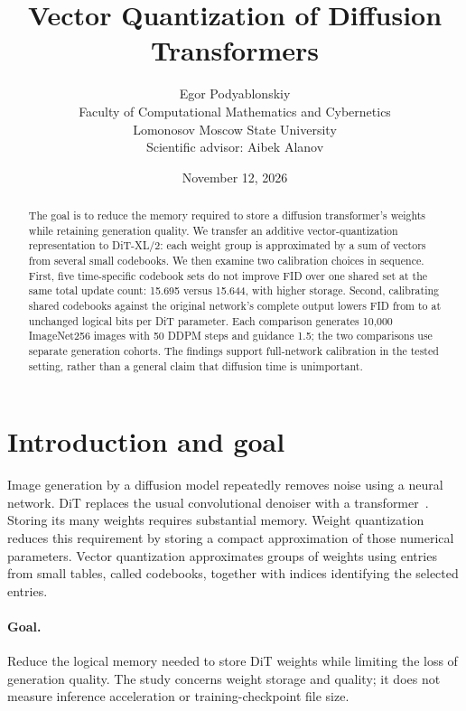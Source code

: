 \documentclass{article}
\title{Vector Quantization of Diffusion Transformers}
\author{Egor Podyablonskiy\\Faculty of Computational Mathematics and Cybernetics\\Lomonosov Moscow State University\\Scientific advisor: Aibek Alanov}
\date{November 12, 2026}
\begin{document}
\maketitle
\begin{abstract}
The goal is to reduce the memory required to store a diffusion transformer's weights while retaining generation quality. We transfer an additive vector-quantization representation to DiT-XL/2: each weight group is approximated by a sum of vectors from several small codebooks. We then examine two calibration choices in sequence. First, five time-specific codebook sets do not improve FID over one shared set at the same total update count: 15.695 versus 15.644, with higher storage. Second, calibrating shared codebooks against the original network's complete output lowers FID from \NativeFID{} to \KDFID{} at unchanged \WholeBpp{} logical bits per DiT parameter. Each comparison generates 10,000 ImageNet256 images with 50 DDPM steps and guidance 1.5; the two comparisons use separate generation cohorts. The findings support full-network calibration in the tested setting, rather than a general claim that diffusion time is unimportant.
\end{abstract}

\section{Introduction and goal}
Image generation by a diffusion model repeatedly removes noise using a neural network. DiT replaces the usual convolutional denoiser with a transformer~\citep{peebles2023dit}. Storing its many weights requires substantial memory. Weight quantization reduces this requirement by storing a compact approximation of those numerical parameters. Vector quantization approximates groups of weights using entries from small tables, called codebooks, together with indices identifying the selected entries.

\paragraph{Goal.}
Reduce the logical memory needed to store DiT weights while limiting the loss of generation quality. The study concerns weight storage and quality; it does not measure inference acceleration or training-checkpoint file size.
\end{document}
